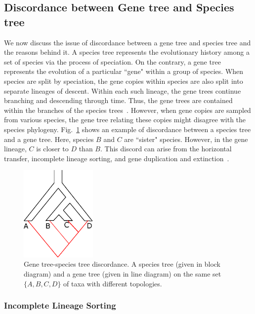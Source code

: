 \subsection{Discordance between Gene tree and Species tree}
We now discuss the issue of discordance between a gene tree and species tree and the reasons behind it. A species tree represents the evolutionary history among a set of species via the process of speciation. On the contrary, a gene tree represents the evolution of a particular ``gene" within a group of species. When species are split by speciation, the gene copies within species are also split into separate lineages of descent.  Within each such lineage, the gene trees continue branching and descending through time. Thus, the gene trees are contained within the branches of the species trees~\cite{maddison1997gene}.
However, when gene copies are sampled from various species, the gene tree relating these copies might disagree with the species phylogeny. Fig.~\ref{fig:discordance} shows an example of discordance between a species tree and a gene tree. Here, species $B$ and $C$ are ``sister" species. However, in the gene lineage, $C$ is closer to $D$ than $B$. This discord can arise from the horizontal transfer, incomplete lineage sorting, and gene duplication and extinction~\cite{maddison1997gene}. 

\begin{figure}[!tb]
	\centering
	\includegraphics[width=0.33\textwidth]{Figure/discordance.eps}
	\caption{Gene tree-species tree discordance. A species tree (given in block diagram) and a gene tree (given in line diagram) on the same set $\{A,B,C,D\}$ of taxa with different topologies.}
	\label{fig:discordance}
\end{figure}



\subsubsection{Incomplete Lineage Sorting}

